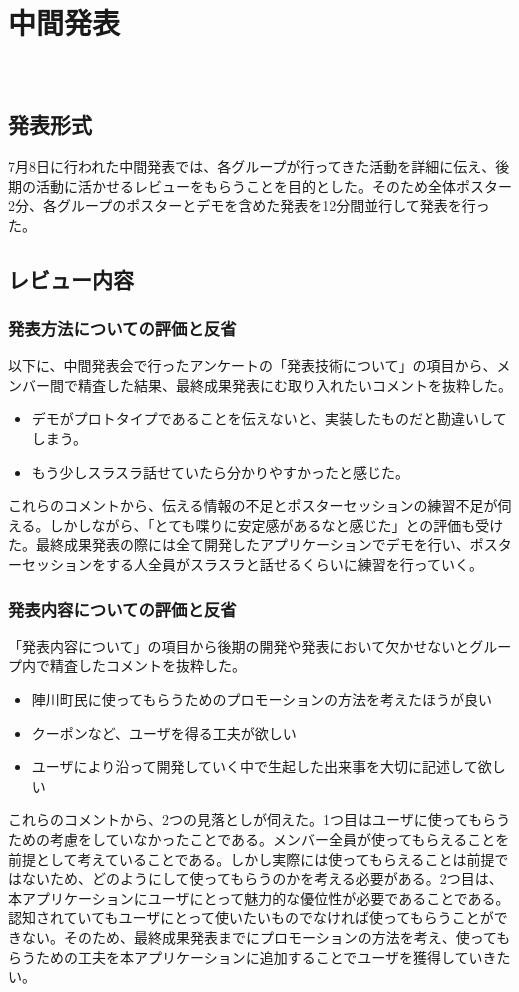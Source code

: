 \chapter{中間発表}
​
\section{発表形式}
7月8日に行われた中間発表では、各グループが行ってきた活動を詳細に伝え、後期の活動に活かせるレビューをもらうことを目的とした。そのため全体ポスター2分、各グループのポスターとデモを含めた発表を12分間並行して発表を行った。

\section{レビュー内容}%
\subsection{発表方法についての評価と反省}%
以下に、中間発表会で行ったアンケートの「発表技術について」の項目から、メンバー間で精査した結果、最終成果発表にむ取り入れたいコメントを抜粋した。
\begin{itemize}
  \item デモがプロトタイプであることを伝えないと、実装したものだと勘違いしてしまう。
  \item もう少しスラスラ話せていたら分かりやすかったと感じた。
\end{itemize}
    これらのコメントから、伝える情報の不足とポスターセッションの練習不足が伺える。しかしながら、「とても喋りに安定感があるなと感じた」との評価も受けた。最終成果発表の際には全て開発したアプリケーションでデモを行い、ポスターセッションをする人全員がスラスラと話せるくらいに練習を行っていく。

\subsection{発表内容についての評価と反省}
    「発表内容について」の項目から後期の開発や発表において欠かせないとグループ内で精査したコメントを抜粋した。
\begin{itemize}
  \item 陣川町民に使ってもらうためのプロモーションの方法を考えたほうが良い
  \item クーポンなど、ユーザを得る工夫が欲しい
  \item ユーザにより沿って開発していく中で生起した出来事を大切に記述して欲しい
\end{itemize}
    これらのコメントから、2つの見落としが伺えた。1つ目はユーザに使ってもらうための考慮をしていなかったことである。メンバー全員が使ってもらえることを前提として考えていることである。しかし実際には使ってもらえることは前提ではないため、どのようにして使ってもらうのかを考える必要がある。2つ目は、本アプリケーションにユーザにとって魅力的な優位性が必要であることである。認知されていてもユーザにとって使いたいものでなければ使ってもらうことができない。そのため、最終成果発表までにプロモーションの方法を考え、使ってもらうための工夫を本アプリケーションに追加することでユーザを獲得していきたい。
